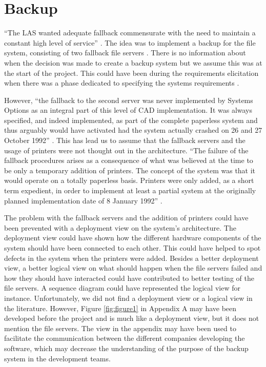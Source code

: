 \section*{Backup}

``The LAS wanted adequate fallback commensurate with the need to maintain a constant high level of service'' \autocite[5038]{officialreport}.
The idea was to implement a backup for the file system, consisting of two fallback file servers \autocite[3132]{officialreport}.
There is no information about when the decision was made to create a backup system but we assume this was at the start of the project.
This could have been during the requirements elicitation when there was a phase dedicated to specifying the systems requirements \autocite[2018a]{officialreport}.

However, ``the fallback to the second server was never implemented by Systems Options as an integral part of this level of CAD implementation.
It was always specified, and indeed implemented, as part of the complete paperless system and thus arguably would have activated had the system actually crashed on 26 and 27 October 1992'' \autocite[4041]{officialreport}.
This has lead us to assume that the fallback servers and the usage of printers were not thought out in the architecture.
``The failure of the fallback procedures arises as a consequence of what was believed at the time to be only a temporary addition of printers.
The concept of the system was that it would operate on a totally paperless basis.
Printers were only added, as a short term expedient, in order to implement at least a partial system at the originally planned implementation date of 8 January 1992'' \autocite[4040]{officialreport}.

The problem with the fallback servers and the addition of printers could have been prevented with a deployment view on the system's architecture.
The deployment view could have shown how the different hardware components of the system should have been connected to each other.
This could have helped to spot defects in the system when the printers were added.
Besides a better deployment view, a better logical view on what should happen when the file servers failed and how they should have interacted could have contributed to better testing of the file servers.
A sequence diagram could have represented the logical view for instance.
Unfortunately, we did not find a deployment view or a logical view in the literature.
However, Figure \ref{fig:figure1} in Appendix A may have been developed before the project and is much like a deployment view, but it does not mention the file servers.
The view in the appendix may have been used to facilitate the communication between the different companies developing the software,
which may decrease the understanding of the purpose of the backup system in the development teams.

